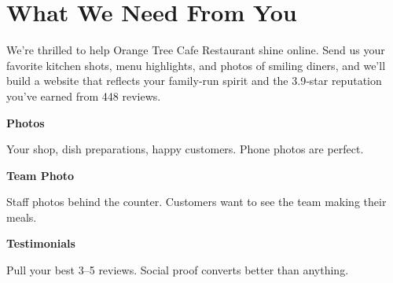 \documentclass[11pt,letterpaper]{article}
\begin{document}
\vspace{0.2em}

\section*{What We Need From You}

We’re thrilled to help Orange Tree Cafe Restaurant shine online. Send us your favorite kitchen shots, menu highlights, and photos of smiling diners, and we’ll build a website that reflects your family‑run spirit and the 3.9‑star reputation you’ve earned from 448 reviews.

\vspace{0.12em}

\noindent\begin{minipage}[t]{0.48\textwidth}
\begin{tcolorbox}[colframe=accent-teal, boxrule=1pt, left=0.7em, right=0.7em, top=0.5em, bottom=0.5em, arc=4pt, boxsep=0pt]
{\bfseries\small\color{accent-teal}Photos}

\vspace{0.15em}

{\small Your shop, dish preparations, happy customers. Phone photos are perfect.}
\end{tcolorbox}

\vspace{0.1em}

\begin{tcolorbox}[colframe=accent-teal, boxrule=1pt, left=0.7em, right=0.7em, top=0.5em, bottom=0.5em, arc=4pt, boxsep=0pt]
{\bfseries\small\color{accent-teal}Team Photo}

\vspace{0.15em}

{\small Staff photos behind the counter. Customers want to see the team making their meals.}
\end{tcolorbox}

\vspace{0.1em}

\begin{tcolorbox}[colframe=accent-teal, boxrule=1pt, left=0.7em, right=0.7em, top=0.5em, bottom=0.5em, arc=4pt, boxsep=0pt]
{\bfseries\small\color{accent-teal}Testimonials}

\vspace{0.15em}

{\small Pull your best 3--5 reviews. Social proof converts better than anything.}
\end{tcolorbox}
\end{minipage}
\end{document}

